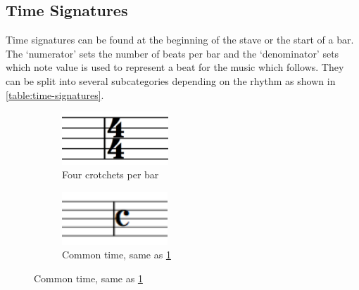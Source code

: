 \subsection{Time Signatures}
\label{sec:music-theory-time-signatures}

Time signatures can be found at the beginning of the stave or the start of a bar. The `numerator' sets the number of beats per bar and the `denominator' sets which note value is used to represent a beat for the music which follows. They can be split into several subcategories depending on the rhythm as shown in \cref{table:time-signatures}.

\begin{figure}[h!]
    \centering
    \begin{subfigure}[b]{.45\linewidth}
        \centering
        \includegraphics[height=2cm]{gfx/music-theory/time-signature-4-4.png}
        \caption{Four crotchets per bar}
        \label{fig:time-signature-4-4}
    \end{subfigure}
    \begin{subfigure}[b]{.45\linewidth}
        \centering
        \includegraphics[height=2cm]{gfx/music-theory/time-signature-common.png}
        \caption{Common time, same as \cref{fig:time-signature-4-4}}
    \end{subfigure}
    

\end{figure}
